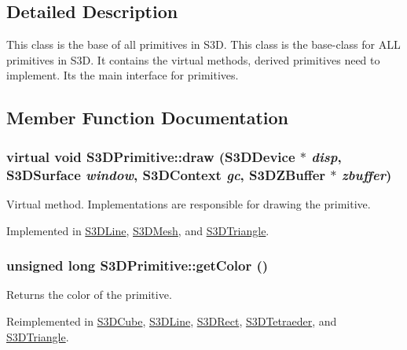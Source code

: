 \subsection{Detailed Description}
This class is the base of all primitives in S3D. This class is the base-\/class for ALL primitives in S3D. It contains the virtual methods, derived primitives need to implement. Its the main interface for primitives. 

\subsection{Member Function Documentation}
\hypertarget{class_s3_d_primitive_a857f042bc63ae6233b63b60089e92b81}{
\subsubsection[{draw}]{\setlength{\rightskip}{0pt plus 5cm}virtual void S3DPrimitive::draw ({\bf S3DDevice} $\ast$ {\em disp}, \/  {\bf S3DSurface} {\em window}, \/  {\bf S3DContext} {\em gc}, \/  {\bf S3DZBuffer} $\ast$ {\em zbuffer})}}
\label{class_s3_d_primitive_a857f042bc63ae6233b63b60089e92b81}


Virtual method. Implementations are responsible for drawing the primitive. 



Implemented in \hyperlink{class_s3_d_line_aa7732c2d83fecb5d9934863d0e7875c1}{S3DLine}, \hyperlink{class_s3_d_mesh_afc47824c491991604931f4ccb0520cd1}{S3DMesh}, and \hyperlink{class_s3_d_triangle_acf6924908c89d6bbc5af23769243beaf}{S3DTriangle}.

\hypertarget{class_s3_d_primitive_a4102845e7754e44c51a87c0fcb391c73}{
\subsubsection[{getColor}]{\setlength{\rightskip}{0pt plus 5cm}unsigned long S3DPrimitive::getColor ()}}
\label{class_s3_d_primitive_a4102845e7754e44c51a87c0fcb391c73}


Returns the color of the primitive. 



Reimplemented in \hyperlink{class_s3_d_cube_ab856b6fa4c1b72be7d2d7b79e26f3c38}{S3DCube}, \hyperlink{class_s3_d_line_a62b49873ae3356cf997ca1fd87a1b7de}{S3DLine}, \hyperlink{class_s3_d_rect_adbf17caac29e632afb9f380e3821a256}{S3DRect}, \hyperlink{class_s3_d_tetraeder_ab79d98573d008f21c9a77f9d3633d6ae}{S3DTetraeder}, and \hyperlink{class_s3_d_triangle_ade8ba96094206ee3dff5c3bc743e0a1c}{S3DTriangle}.

